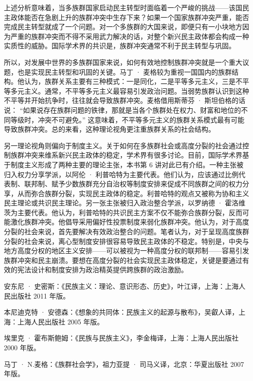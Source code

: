 上述分析意味着，当多族群国家启动民主转型时面临着一个严峻的挑战——该国民主政体能否在急剧上升的族群冲突中生存下来？如果一个国家族群冲突严重，能否完成民主转型就成了一个问题。对一个多族群的大国来说，即便只有一小块地方因为严重的族群冲突而不得不采用武力解决的话，对整个新兴民主政体都会构成一种实质性的威胁。国际学术界的共识是，族群冲突通常不利于民主转型与巩固。

所以，对发展中世界的多族群国家来说，如何有效地控制族群冲突就是一个重大议题，也是实现民主转型和巩固的关键。马丁 · 麦格较为重视一国国内的族群结构。他认为，族群关系主要有三种模式：一是同化，二是平等多元主义，三是不平等多元主义。通常，不平等多元主义最容易引发政治问题。当弱势族群认识到这种不平等并开始抗争时，往往就会导致族群冲突。麦格借用斯蒂芬 · 斯坦伯格的话说： “如果说存在族群问题的铁律，那就是当各个族群处在权力、财富和地位的不同等级时，冲突不可避免。” 这意味着，不平等多元主义的族群关系模式最有可能导致族群冲突。总的来看，这种理论视角更注重族群关系的社会结构。

另一理论视角则偏向于制度主义。关于如何在多族群社会或高度分裂的社会通过控制族群冲突来维系新兴民主政体的稳定，学术界有很多讨论。目前，国际学术界基于制度主义形成了两种主要的理论主张，本书第 6 讲对此已有介绍。一种主张被归入权力分享学派，以阿伦 · 利普哈特为主要代表。他们认为，应该通过比例代表制、联邦制、赋予少数族群充分自治权等制度安排来促成不同族群之间的权力分享，从而弥合族群分裂，实现民主政体的稳定。利普哈特的观点又被称为协和主义民主理论或共识民主理论。另一张主张被归入政治整合学派，以罗纳德 · 霍洛维茨为主要代表。他认为，利普哈特的共识民主方案不仅不能弥合族群分裂，反而可能激化族群冲突。他倡导采用偏好性投票制度来弱化族群冲突。他认为，对于高度分裂的社会来说，首先要解决有效政治整合的问题。笔者认为，对于呈现高度族群分裂的社会来说，离心型制度安排很容易导致民主政体的不稳定。特别是，中央与地方高度分权的地区主义安排——可以被视为一种高度分权的联邦制——容易引发族群冲突和民主崩溃。要想在高度分裂的社会实现民主政体稳定，关键是要通过有效的宪法设计和制度安排为政治精英提供跨族群的政治激励。


安东尼 · 史密斯：《民族主义：理论、意识形态、历史》，叶江译，上海：上海人民出版社 2011 年版。

本尼迪克特 · 安德森：《想象的共同体：民族主义的起源与散布》，吴叡人译，上海：上海人民出版社 2005 年版。

埃里克 · 霍布斯鲍姆：《民族与民族主义》，李金梅译，上海：上海人民出版社 2000 年版。

马丁 · N.麦格：《族群社会学》，祖力亚提 · 司马义译，北京：华夏出版社 2007 年版。
